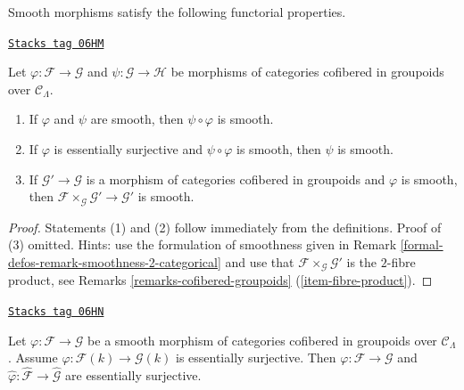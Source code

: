 Smooth morphisms satisfy the following functorial properties.

\begin{lemma}
\label{formal-defos-lemma-smooth-properties}
\href{https://stacks.math.columbia.edu/tag/06HM}{\texttt{Stacks tag 06HM}}

Let $\varphi : \mathcal{F} \to \mathcal{G}$ and $\psi : \mathcal{G}
\to \mathcal{H}$ be morphisms of categories cofibered in groupoids over
$\mathcal{C}_\Lambda$.
\begin{enumerate}
\item If $\varphi$ and $\psi$ are smooth, then $\psi \circ \varphi$ is smooth.
\item If $\varphi$ is essentially surjective and $\psi \circ \varphi$ is
smooth, then $\psi$ is smooth.
\item If $\mathcal{G}' \to \mathcal{G}$ is a morphism of categories
cofibered in groupoids and $\varphi$ is smooth, then
$\mathcal{F} \times_\mathcal{G} \mathcal{G}' \to \mathcal{G}'$ is smooth.
\end{enumerate}
\end{lemma}

\begin{proof}
Statements (1) and (2) follow immediately from the definitions.
Proof of (3) omitted. Hints: use the formulation of smoothness given in
Remark \ref{formal-defos-remark-smoothness-2-categorical}
and use that $\mathcal{F} \times_\mathcal{G} \mathcal{G}'$
is the $2$-fibre product, see
Remarks \ref{remarks-cofibered-groupoids} (\ref{item-fibre-product}).
\end{proof}

\begin{lemma}
\label{formal-defos-lemma-smooth-morphism-essentially-surjective}
\href{https://stacks.math.columbia.edu/tag/06HN}{\texttt{Stacks tag 06HN}}

Let $\varphi : \mathcal{F} \to \mathcal{G}$ be a smooth morphism of
categories cofibered in groupoids over $\mathcal{C}_\Lambda$.  Assume
$\varphi : \mathcal{F}(k) \to \mathcal{G}(k)$ is essentially surjective.
Then $\varphi : \mathcal{F} \to \mathcal{G}$ and
$\widehat{\varphi} : \widehat{\mathcal{F}} \to \widehat{\mathcal{G}}$
are essentially surjective.
\end{lemma}

